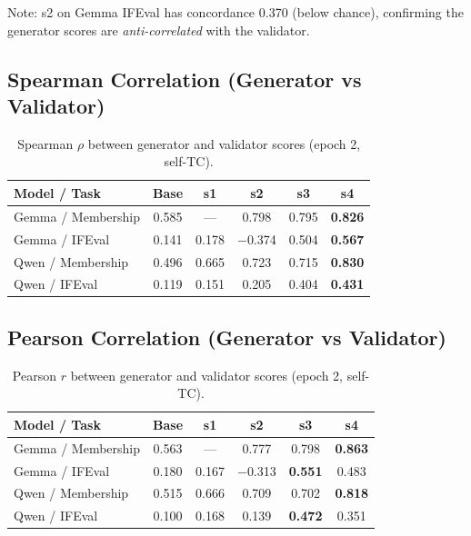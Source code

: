 \documentclass[11pt,a4paper]{article}
\begin{document}
Note: s2 on Gemma IFEval has concordance 0.370 (below chance), confirming the generator scores are \emph{anti-correlated} with the validator.

\subsection{Spearman Correlation (Generator vs Validator)}

\begin{table}[H]
\centering
\caption{Spearman $\rho$ between generator and validator scores (epoch 2, self-TC).}
\label{tab:spearman}
\begin{tabular}{lccccc}
\toprule
\textbf{Model / Task} & \textbf{Base} & \textbf{s1} & \textbf{s2} & \textbf{s3} & \textbf{s4} \\
\midrule
Gemma / Membership & 0.585 & --- & 0.798 & 0.795 & \textbf{0.826} \\
Gemma / IFEval & 0.141 & 0.178 & $-$0.374 & 0.504 & \textbf{0.567} \\
Qwen / Membership & 0.496 & 0.665 & 0.723 & 0.715 & \textbf{0.830} \\
Qwen / IFEval & 0.119 & 0.151 & 0.205 & 0.404 & \textbf{0.431} \\
\bottomrule
\end{tabular}
\end{table}

\subsection{Pearson Correlation (Generator vs Validator)}

\begin{table}[H]
\centering
\caption{Pearson $r$ between generator and validator scores (epoch 2, self-TC).}
\label{tab:pearson}
\begin{tabular}{lccccc}
\toprule
\textbf{Model / Task} & \textbf{Base} & \textbf{s1} & \textbf{s2} & \textbf{s3} & \textbf{s4} \\
\midrule
Gemma / Membership & 0.563 & --- & 0.777 & 0.798 & \textbf{0.863} \\
Gemma / IFEval & 0.180 & 0.167 & $-$0.313 & \textbf{0.551} & 0.483 \\
Qwen / Membership & 0.515 & 0.666 & 0.709 & 0.702 & \textbf{0.818} \\
Qwen / IFEval & 0.100 & 0.168 & 0.139 & \textbf{0.472} & 0.351 \\
\bottomrule
\end{tabular}
\end{table}
\end{document}

